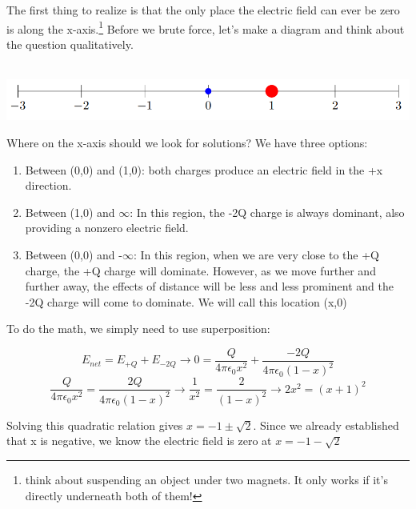 \begin{solution}
The first thing to realize is that the only place the electric field can ever be zero is along the x-axis.\footnote{think about suspending an object under two magnets. It only works if it's directly underneath both of them!} Before we brute force, let's make a diagram and think about the question qualitatively.
\\\\
\begin{center}
\includegraphics{Figures/Figure27}
\end{center}
Where on the x-axis should we look for solutions? We have three options:
\begin{enumerate}
    \item Between (0,0) and (1,0): both charges produce an electric field in the +x direction.
    \item Between (1,0) and $\infty$: In this region, the -2Q charge is always dominant, also providing a nonzero electric field.
    \item Between (0,0) and -$\infty$: In this region, when we are very close to the +Q charge, the +Q charge will dominate. However, as we move further and further away, the effects of distance will be less and less prominent and the -2Q charge will come to dominate. We will call this location (x,0)
\end{enumerate}
 
To do the math, we simply need to use superposition:

\begin{equation}
    E_{net} = E_{+Q} + E_{-2Q} \rightarrow
    0 = \frac{Q}{4\pi\epsilon_0x^2} + 
        \frac{-2Q}{4\pi\epsilon_0(1-x)^2}
\end{equation}
\begin{equation}
    \frac{Q}{4\pi\epsilon_0x^2} = 
    \frac{2Q}{4\pi\epsilon_0(1-x)^2} \rightarrow
    \frac{1}{x^2} = \frac{2}{(1-x)^2} \rightarrow
    2x^2 = (x+1)^2
\end{equation}

Solving this quadratic relation gives $x=-1\pm\sqrt{2}$. Since we already established that x is negative, we know the electric field is zero at $x=-1-\sqrt{2}$

\end{solution}

